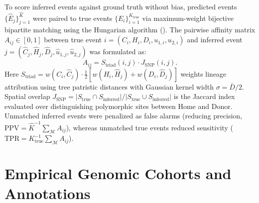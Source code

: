 To score inferred events against ground truth without bias, predicted events $\{\hat{E}_j\}_{j=1}^{\hat{K}}$ were paired to true events $\{E_i\}_{i=1}^{K_{\mathrm{true}}}$ via maximum-weight bijective bipartite matching using the Hungarian algorithm ().
The pairwise affinity matrix $A_{ij} \in [0, 1]$ between true event $i = (C_i, H_i, D_i, u_{1,i}, u_{2,i})$ and inferred event $j = (\hat{C}_j, \hat{H}_j, \hat{D}_j, \hat{u}_{1,j}, \hat{u}_{2,j})$ was formulated as:
\begin{equation}
A_{ij} = S_{\mathrm{triad}}(i, j) \cdot J_{\mathrm{SNP}}(i, j).
\end{equation}
Here $S_{\mathrm{triad}} = w(C_i, \hat{C}_j) \cdot \frac{1}{2}\left[w(H_i, \hat{H}_j) + w(D_i, \hat{D}_j)\right]$ weights lineage attribution using tree patristic distances with Gaussian kernel width $\sigma = \bar{D} / 2$.
Spatial overlap $J_{\mathrm{SNP}} = |S_{\mathrm{true}} \cap S_{\mathrm{inferred}}| / |S_{\mathrm{true}} \cup S_{\mathrm{inferred}}|$ is the Jaccard index evaluated over distinguishing polymorphic sites between Home and Donor.
Unmatched inferred events were penalized as false alarms (reducing precision, $\text{PPV} = \hat{K}^{-1} \sum_{\mathcal{M}} A_{ij}$), whereas unmatched true events reduced sensitivity ($\text{TPR} = K_{\mathrm{true}}^{-1} \sum_{\mathcal{M}} A_{ij}$).

\section{Empirical Genomic Cohorts and Annotations}
\label{supp:empirical_cohorts}

